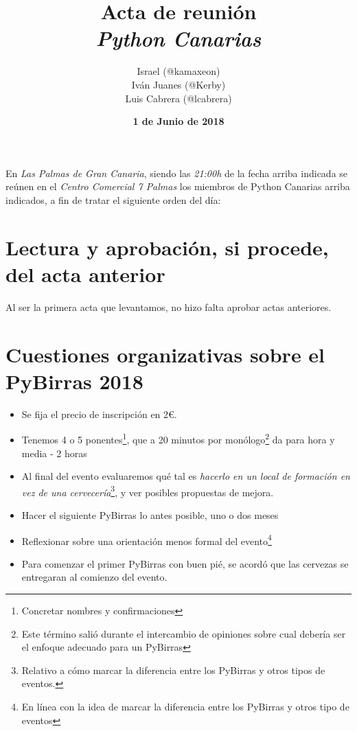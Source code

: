 \documentclass[a4paper, 12pt]{article}
\title{\huge \textbf{Acta de reunión} \\ \textit{Python Canarias}}
\date{\textbf{1 de Junio de 2018}}
\author{
    Israel (@kamaxeon)\\
    Iván Juanes (@Kerby)\\ 
    Luis Cabrera (@lcabrera)
}
\begin{document}
\renewcommand{\contentsname}{Orden del día}

\maketitle

En \textit{Las Palmas de Gran Canaria}, siendo las \textit{21:00h} de la fecha arriba indicada se reúnen en el \textit{Centro Comercial 7 Palmas} los miembros de Python Canarias arriba indicados, a fin de tratar el siguiente orden del día:

\tableofcontents


\section{Lectura y aprobación, si procede, del acta anterior}

Al ser la primera acta que levantamos, no hizo falta aprobar actas anteriores.

\section{Cuestiones organizativas sobre el PyBirras 2018}

\begin{itemize}

	\item Se fija el precio de inscripción en 2\euro.
	\item Tenemos 4 o 5 ponentes\footnote{Concretar nombres y confirmaciones}, que a 20 minutos por monólogo\footnote{Este término salió durante el intercambio de opiniones sobre cual debería ser el enfoque adecuado para un PyBirras} da para hora y media - 2 horas 
	\item Al final del evento evaluaremos qué tal es \textit{hacerlo en un local de formación en vez de una cervecería}\footnote{Relativo a cómo marcar la diferencia entre los PyBirras y otros tipos de eventos.}, y ver posibles propuestas de mejora.
	\item Hacer el siguiente PyBirras lo antes posible, uno o dos meses
	\item Reflexionar sobre una orientación menos formal del evento\footnote{En línea con la idea de marcar la diferencia entre los PyBirras y otros tipo de eventos}
	\item Para comenzar el primer PyBirras con buen pié, se acordó que las cervezas se entregaran al comienzo del evento.

\end{itemize}
\end{document}

